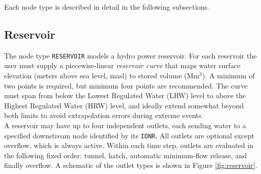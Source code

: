 \documentclass[a4paper, 12pt]{report}
\begin{document}
	Each node type is described in detail in the following subsections.

	\subsection{Reservoir}
	\label{subsec:reservoir}

	The node type \texttt{RESERVOIR} models a hydro power reservoir. For each reservoir the user must supply a piecewise-linear \emph{reservoir curve} that maps water surface elevation (meters above sea level, masl) to stored volume (Mm$^3$). A minimum of two points is required, but minimum four points are recommended. The curve must span from below the Lowest Regulated Water (LRW) level to above the Highest Regulated Water (HRW) level, and ideally extend somewhat beyond both limits to avoid extrapolation errors during extreme events. \\

	A reservoir may have up to four independent outlets, each sending water to a specified
	downstream node identified by its \texttt{IDNR}. All outlets are optional except overflow,
	which is always active. Within each time step, outlets are evaluated in the following fixed
	order: tunnel, hatch, automatic minimum-flow release, and finally overflow. A schematic of the
	outlet types is shown in Figure \ref{fig:reservoir}.
	
\end{document}
